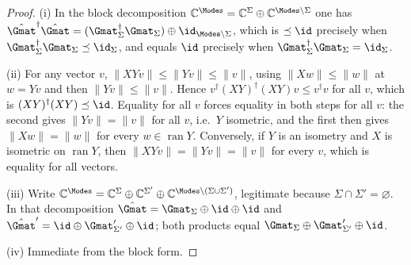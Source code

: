 \begin{proof}
(i) In the block decomposition $\mathbb{C}^{\Modes}=\mathbb{C}^{\Sigma}\oplus
\mathbb{C}^{\Modes\setminus\Sigma}$ one has
$\hat\Gmat^\dagger\hat\Gmat=(\Gmat_\Sigma^\dagger\Gmat_\Sigma)
\oplus\id_{\Modes\setminus\Sigma}$, which is $\preceq\id$ precisely when
$\Gmat_\Sigma^\dagger\Gmat_\Sigma\preceq\id_\Sigma$, and equals $\id$ precisely
when $\Gmat_\Sigma^\dagger\Gmat_\Sigma=\id_\Sigma$.

(ii) For any vector $v$, $\lVert XYv\rVert\le\lVert Yv\rVert\le\lVert v\rVert$,
using $\lVert Xw\rVert\le\lVert w\rVert$ at $w=Yv$ and then
$\lVert Yv\rVert\le\lVert v\rVert$. Hence
$v^\dagger(XY)^\dagger(XY)v\le v^\dagger v$ for all $v$, which is
$(XY)^\dagger(XY)\preceq\id$. Equality for all $v$ forces equality in both
steps for all $v$: the second gives $\lVert Yv\rVert=\lVert v\rVert$ for all
$v$, i.e.\ $Y$ isometric, and the first then gives
$\lVert Xw\rVert=\lVert w\rVert$ for every $w\in\operatorname{ran}Y$.
Conversely, if $Y$ is an isometry and $X$ is isometric on
$\operatorname{ran}Y$, then $\lVert XYv\rVert=\lVert Yv\rVert=\lVert v\rVert$
for every $v$, which is equality for all vectors.

(iii) Write $\mathbb{C}^{\Modes}=\mathbb{C}^{\Sigma}\oplus\mathbb{C}^{\Sigma'}
\oplus\mathbb{C}^{\Modes\setminus(\Sigma\cup\Sigma')}$, legitimate because
$\Sigma\cap\Sigma'=\varnothing$. In that decomposition
$\hat\Gmat=\Gmat_\Sigma\oplus\id\oplus\id$ and
$\hat\Gmat'=\id\oplus\Gmat'_{\Sigma'}\oplus\id$; both products equal
$\Gmat_\Sigma\oplus\Gmat'_{\Sigma'}\oplus\id$.

(iv) Immediate from the block form.
\end{proof}
